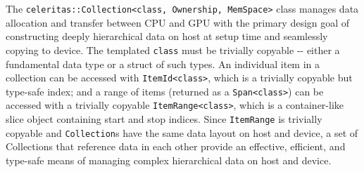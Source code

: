The
\texttt{celeritas::Collection\textless{}class,\ Ownership,\ MemSpace\textgreater{}}
class manages data allocation and transfer between CPU and GPU with the
primary design goal of constructing deeply hierarchical data on host at
setup time and seamlessly copying to device. The templated
\texttt{class} must be trivially copyable -\/- either a fundamental data
type or a struct of such types. An individual item in a collection can
be accessed with \texttt{ItemId\textless{}class\textgreater{}}, which is a
trivially copyable but type-safe index; and a range of items (returned
as a \texttt{Span\textless{}class\textgreater{}}) can be accessed with a
trivially copyable \texttt{ItemRange\textless{}class\textgreater{}},
which is a container-like slice object containing start and stop
indices. Since \texttt{ItemRange} is trivially copyable and
\texttt{Collection}s have the same data layout on host and device, a set
of Collections that reference data in each other provide an effective,
efficient, and type-safe means of managing complex hierarchical data on
host and device.

